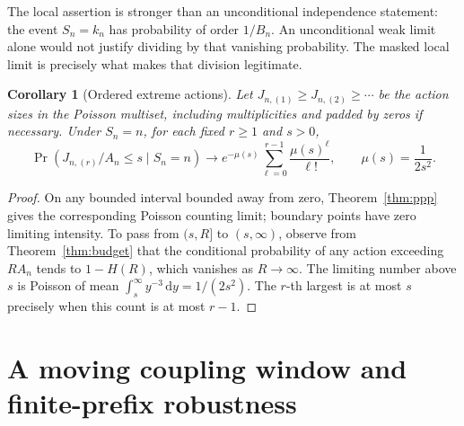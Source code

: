\documentclass[11pt,a4paper]{article}
\numberwithin{equation}{section}
\newtheorem{corollary}[theorem]{Corollary}
\theoremstyle{definition}
\theoremstyle{remark}
\newcommand{\dd}{\,\mathrm d}
\begin{document}
The local assertion is stronger than an unconditional independence statement:
the event \(S_n=k_n\) has probability of order \(1/B_n\). An unconditional
weak limit alone would not justify dividing by that vanishing probability.
The masked local limit is precisely what makes that division legitimate.

\begin{corollary}[Ordered extreme actions]
\label{cor:ordered}
Let \(J_{n,(1)}\ge J_{n,(2)}\ge\cdots\) be the action sizes in the Poisson
multiset, including multiplicities and padded by zeros if necessary. Under
\(S_n=n\), for each fixed \(r\ge1\) and \(s>0\),
\begin{equation}
 \Pr\left(J_{n,(r)}/A_n\le s\mid S_n=n\right)
 \longrightarrow e^{-\mu(s)}\sum_{\ell=0}^{r-1}\frac{\mu(s)^\ell}{\ell!},
 \qquad \mu(s)=\frac1{2s^2}.
 \label{eq:ordered}
\end{equation}
\end{corollary}
\begin{proof}
On any bounded interval bounded away from zero, Theorem~\ref{thm:ppp} gives
the corresponding Poisson counting limit; boundary points have zero limiting
intensity. To pass from \((s,R]\) to \((s,\infty)\), observe from
Theorem~\ref{thm:budget} that the conditional probability of any action
exceeding \(RA_n\) tends to \(1-H(R)\), which vanishes as \(R\to\infty\).
The limiting number above \(s\) is Poisson of mean
\(\int_s^\infty y^{-3}\dd y=1/(2s^2)\). The \(r\)-th largest is at most
\(s\) precisely when this count is at most \(r-1\).
\end{proof}

\section{A moving coupling window and finite-prefix robustness}
\label{sec:coupling}
\end{document}
